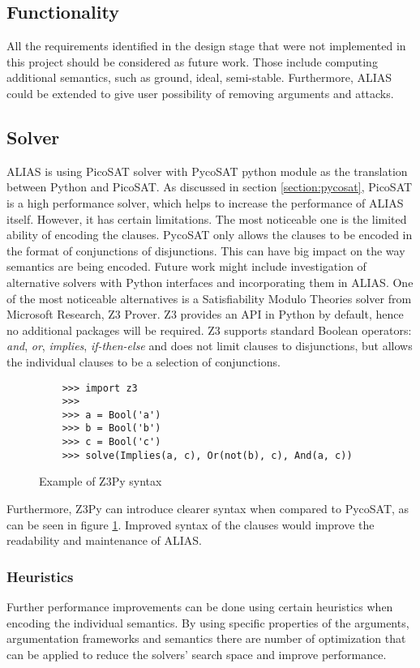 \subsection{Functionality}
All the requirements identified in the design stage that were not implemented in this project should be considered as future work. Those include computing additional semantics, such as ground, ideal, semi-stable. Furthermore, ALIAS could be extended to give user possibility of removing arguments and attacks. 

\subsection{Solver}
ALIAS is using PicoSAT solver with PycoSAT python module as the translation between Python and PicoSAT. As discussed in section \ref{section:pycosat}, PicoSAT is a high performance solver, which helps to increase the performance of ALIAS itself. However, it has certain limitations. The most noticeable one is the limited ability of encoding the clauses. PycoSAT only allows the clauses to be encoded in the format of conjunctions of disjunctions. This can have big impact on the way semantics are being encoded. Future work might include investigation of alternative solvers with Python interfaces and incorporating them in ALIAS. One of the most noticeable alternatives is a Satisfiability Modulo Theories solver from Microsoft Research, Z3 Prover. Z3 provides an API in Python by default, hence no additional packages will be required. Z3 supports standard Boolean operators: \textit{and}, \textit{or}, \textit{implies}, \textit{if-then-else} and does not limit clauses to disjunctions, but allows the individual clauses to be a selection of conjunctions. 

\begin{figure}
	\begin{verbatim}
	>>> import z3
	>>>
	>>> a = Bool('a')
	>>> b = Bool('b')
	>>> c = Bool('c')
	>>> solve(Implies(a, c), Or(not(b), c), And(a, c))
	\end{verbatim}
	\caption{Example of Z3Py syntax}
	\label{fig:z3}
\end{figure}

Furthermore, Z3Py can introduce clearer syntax when compared to PycoSAT, as can be seen in figure \ref{fig:z3}. Improved syntax of the clauses would improve the readability and maintenance of ALIAS. 

\subsubsection{Heuristics}
Further performance improvements can be done using certain heuristics when encoding the individual semantics. By using specific properties of the arguments, argumentation frameworks and semantics there are number of optimization that can be applied to reduce the solvers' search space and improve performance.


